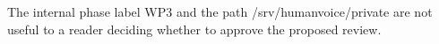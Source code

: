 \documentclass{article}
\begin{document}
The internal phase label WP3 and the path /srv/humanvoice/private are not
useful to a reader deciding whether to approve the proposed review.
\end{document}
